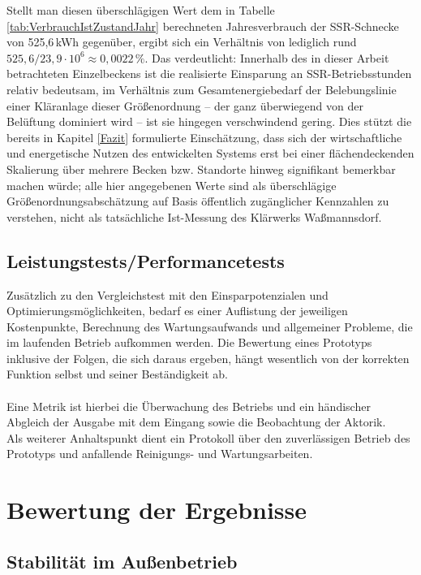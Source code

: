 Stellt man diesen überschlägigen Wert dem in Tabelle \ref{tab:VerbrauchIstZustandJahr} berechneten Jahresverbrauch der SSR-Schnecke von 525,6\,kWh gegenüber, ergibt sich ein Verhältnis von lediglich rund $525{,}6 / 23{,}9\cdot10^6 \approx 0{,}0022\,\%$. Das verdeutlicht: Innerhalb des in dieser Arbeit betrachteten Einzelbeckens ist die realisierte Einsparung an SSR-Betriebsstunden relativ bedeutsam, im Verhältnis zum Gesamtenergiebedarf der Belebungslinie einer Kläranlage dieser Größenordnung -- der ganz überwiegend von der Belüftung dominiert wird -- ist sie hingegen verschwindend gering. Dies stützt die bereits in Kapitel \ref{Fazit} formulierte Einschätzung, dass sich der wirtschaftliche und energetische Nutzen des entwickelten Systems erst bei einer flächendeckenden Skalierung über mehrere Becken bzw. Standorte hinweg signifikant bemerkbar machen würde; alle hier angegebenen Werte sind als überschlägige Größenordnungsabschätzung auf Basis öffentlich zugänglicher Kennzahlen zu verstehen, nicht als tatsächliche Ist-Messung des Klärwerks Waßmannsdorf.

\subsection{Leistungstests/Performancetests}
Zusätzlich zu den Vergleichstest mit den Einsparpotenzialen und Optimierungsmöglichkeiten, bedarf es einer Auflistung der jeweiligen Kostenpunkte, Berechnung des Wartungsaufwands und allgemeiner Probleme, die im laufenden Betrieb aufkommen werden. Die Bewertung eines Prototyps inklusive der Folgen, die sich daraus ergeben, hängt wesentlich von der korrekten Funktion selbst und seiner Beständigkeit ab.  \\ \\

Eine Metrik ist hierbei die Überwachung des Betriebs und ein händischer Abgleich der Ausgabe mit dem Eingang sowie die Beobachtung der Aktorik. \\
Als weiterer Anhaltspunkt dient ein Protokoll über den zuverlässigen Betrieb des Prototyps und anfallende Reinigungs- und Wartungsarbeiten.





\section{Bewertung der Ergebnisse}

\subsection{Stabilität im Außenbetrieb}

